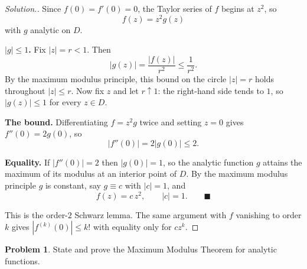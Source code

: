 \documentclass[11pt,a4paper]{article}
\theoremstyle{definition}
\newtheorem{problemx}{Problem}[section]
\newenvironment{problem}{\begin{problemx}}{\end{problemx}}
\newenvironment{solution}
  {\renewcommand{\qedsymbol}{}\begin{proof}[\textit{Solution}.]}
  {\end{proof}}
\begin{document}
\begin{solution}
Since $f(0) = f'(0) = 0$, the Taylor series of $f$ begins at $z^{2}$, so
$$f(z) = z^{2}g(z)$$
with $g$ analytic on $D$.

\textbf{$\left|g\right| \leq 1$.} Fix $\left|z\right| = r < 1$. Then
$$\left|g(z)\right| = \frac{\left|f(z)\right|}{r^{2}} \leq \frac{1}{r^{2}} .$$
By the maximum modulus principle, this bound on the circle $\left|z\right| = r$
holds throughout $\left|z\right| \leq r$. Now fix $z$ and let $r \uparrow 1$: the
right-hand side tends to $1$, so $\left|g(z)\right| \leq 1$ for every $z \in D$.

\textbf{The bound.} Differentiating $f = z^{2}g$ twice and setting $z = 0$ gives
$f''(0) = 2g(0)$, so
$$\left|f''(0)\right| = 2\left|g(0)\right| \leq \boxed{2 .}$$

\textbf{Equality.} If $\left|f''(0)\right| = 2$ then $\left|g(0)\right| = 1$, so the
analytic function $g$ attains the maximum of its modulus at an interior point of
$D$. By the maximum modulus principle $g$ is constant, say $g \equiv c$ with
$\left|c\right| = 1$, and
$$f(z) = c\,z^{2},\qquad \left|c\right| = 1 . \qquad \blacksquare$$

This is the order-$2$ Schwarz lemma. The same argument with $f$ vanishing to order
$k$ gives $\left|f^{(k)}(0)\right| \leq k!$ with equality only for $cz^{k}$.
\end{solution}


\begin{problem}
State and prove the Maximum Modulus Theorem for analytic functions.
\end{problem}
\end{document}
